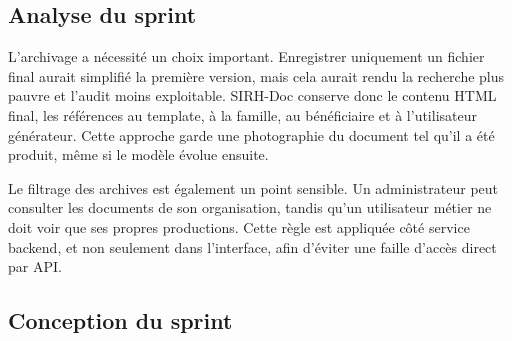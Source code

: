 \subsection{Analyse du sprint}

L'archivage a nécessité un choix important. Enregistrer uniquement un fichier final aurait simplifié la première version, mais cela aurait rendu la recherche plus pauvre et l'audit moins exploitable. SIRH-Doc conserve donc le contenu HTML final, les références au template, à la famille, au bénéficiaire et à l'utilisateur générateur. Cette approche garde une photographie du document tel qu'il a été produit, même si le modèle évolue ensuite.

Le filtrage des archives est également un point sensible. Un administrateur peut consulter les documents de son organisation, tandis qu'un utilisateur métier ne doit voir que ses propres productions. Cette règle est appliquée côté service backend, et non seulement dans l'interface, afin d'éviter une faille d'accès direct par API.

\subsection{Conception du sprint}

